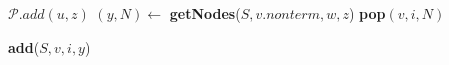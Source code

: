 \begin{algorithmic}   
        \State $\mathcal{P}.add(u,z)$
            \State $(y,N) \gets$ \textbf{getNodes}($S, v.nonterm, w, z$)
                \State \textbf{pop}$(v,i,N)$ 
            \EndIf
            
                \State \textbf{add}($S,v,i,y$)
            \EndIf
        \EndFor
    \EndIf
\EndFunction
\end{algorithmic}